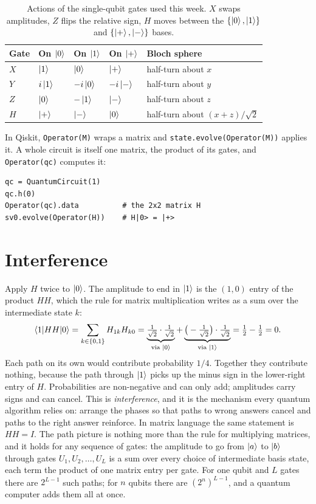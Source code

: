 \documentclass[11pt]{article}
\newcommand{\code}[1]{\texttt{#1}}
\begin{document}
\begin{table}[h]
\centering
\small
\begin{tabular}{@{}lllll@{}}
\toprule
Gate & On $\ket{0}$ & On $\ket{1}$ & On $\ket{+}$ & Bloch sphere \\
\midrule
$X$ & $\ket{1}$ & $\ket{0}$ & $\ket{+}$ & half-turn about $x$ \\
$Y$ & $i\ket{1}$ & $-i\ket{0}$ & $-i\ket{-}$ & half-turn about $y$ \\
$Z$ & $\ket{0}$ & $-\ket{1}$ & $\ket{-}$ & half-turn about $z$ \\
$H$ & $\ket{+}$ & $\ket{-}$ & $\ket{0}$ & half-turn about $(x+z)/\sqrt2$ \\
\bottomrule
\end{tabular}
\caption{Actions of the single-qubit gates used this week. $X$ swaps amplitudes, $Z$ flips the relative sign, $H$ moves between the $\{\ket0,\ket1\}$ and $\{\ket+,\ket-\}$ bases.}
\label{tab:gates}
\end{table}

In Qiskit, \code{Operator(M)} wraps a matrix and \code{state.evolve(Operator(M))} applies it. A whole circuit is itself one matrix, the product of its gates, and \code{Operator(qc)} computes it:
\begin{lstlisting}
qc = QuantumCircuit(1)
qc.h(0)
Operator(qc).data          # the 2x2 matrix H
sv0.evolve(Operator(H))    # H|0> = |+>
\end{lstlisting}

\section{Interference}
\label{sec:interference}

Apply $H$ twice to $\ket{0}$. The amplitude to end in $\ket{1}$ is the $(1,0)$ entry of the product $HH$, which the rule for matrix multiplication writes as a sum over the intermediate state $k$:
\begin{equation}
\braket{1|HH|0} = \sum_{k\in\{0,1\}} H_{1k}H_{k0}
= \underbrace{\tfrac{1}{\sqrt2}\cdot\tfrac{1}{\sqrt2}}_{\text{via }\ket{0}}
+ \underbrace{\big(-\tfrac{1}{\sqrt2}\big)\cdot\tfrac{1}{\sqrt2}}_{\text{via }\ket{1}}
= \tfrac12 - \tfrac12 = 0 .
\label{eq:paths}
\end{equation}
Each path on its own would contribute probability $1/4$. Together they contribute nothing, because the path through $\ket{1}$ picks up the minus sign in the lower-right entry of $H$. Probabilities are non-negative and can only add; amplitudes carry signs and can cancel. This is \emph{interference}, and it is the mechanism every quantum algorithm relies on: arrange the phases so that paths to wrong answers cancel and paths to the right answer reinforce. In matrix language the same statement is $HH = I$. The path picture is nothing more than the rule for multiplying matrices, and it holds for any sequence of gates: the amplitude to go from $\ket{a}$ to $\ket{b}$ through gates $U_1, U_2, \ldots, U_L$ is a sum over every choice of intermediate basis state, each term the product of one matrix entry per gate. For one qubit and $L$ gates there are $2^{L-1}$ such paths; for $n$ qubits there are $(2^n)^{L-1}$, and a quantum computer adds them all at once.
\end{document}

